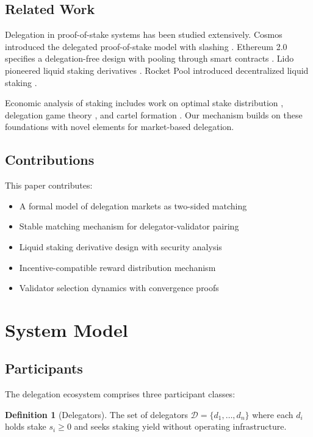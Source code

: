 \documentclass[11pt,a4paper]{article}
\theoremstyle{definition}
\newtheorem{definition}{Definition}[section]
\theoremstyle{remark}
\begin{document}
\subsection{Related Work}

Delegation in proof-of-stake systems has been studied extensively. Cosmos introduced the delegated proof-of-stake model with slashing \cite{kwon2019cosmos}. Ethereum 2.0 specifies a delegation-free design with pooling through smart contracts \cite{buterin2020eth2}. Lido pioneered liquid staking derivatives \cite{lido2020}. Rocket Pool introduced decentralized liquid staking \cite{rocketpool2021}.

Economic analysis of staking includes work on optimal stake distribution \cite{fanti2019staking}, delegation game theory \cite{amoussou2020stake}, and cartel formation \cite{crain2021cartel}. Our mechanism builds on these foundations with novel elements for market-based delegation.

\subsection{Contributions}

This paper contributes:
\begin{itemize}
    \item A formal model of delegation markets as two-sided matching
    \item Stable matching mechanism for delegator-validator pairing
    \item Liquid staking derivative design with security analysis
    \item Incentive-compatible reward distribution mechanism
    \item Validator selection dynamics with convergence proofs
\end{itemize}

\section{System Model}

\subsection{Participants}

The delegation ecosystem comprises three participant classes:

\begin{definition}[Delegators]
The set of delegators $\mathcal{D} = \{d_1, \ldots, d_n\}$ where each $d_i$ holds stake $s_i \geq 0$ and seeks staking yield without operating infrastructure.
\end{definition}
\end{document}

